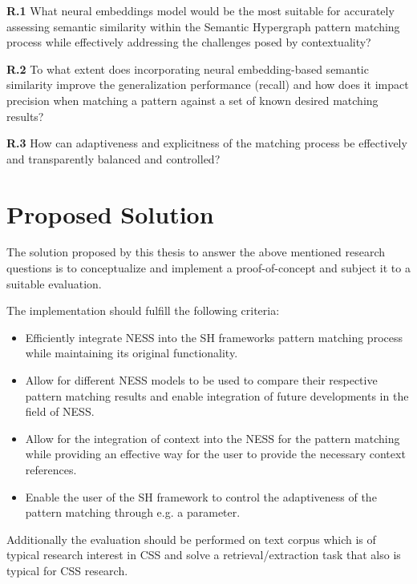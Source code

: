 \documentclass[11pt]{scrreprt}
\begin{document}
\textbf{R.1} What neural embeddings model would be the most suitable for accurately assessing semantic similarity within the Semantic Hypergraph pattern matching process while effectively addressing the challenges posed by contextuality?

\textbf{R.2} To what extent does incorporating neural embedding-based semantic similarity improve the generalization performance (recall) and how does it impact precision when matching a pattern against a set of known desired matching results?

\textbf{R.3} How can adaptiveness and explicitness of the matching process be effectively and transparently balanced and controlled?


\section{Proposed Solution}

The solution proposed by this thesis to answer the above mentioned research questions is to conceptualize and implement a proof-of-concept and subject it to a suitable evaluation. 

The implementation should fulfill the following criteria:

\begin{itemize}
	\item Efficiently integrate NESS into the SH frameworks pattern matching process while maintaining its original functionality.
	\item Allow for different NESS models to be used to compare their respective pattern matching results and enable integration of future developments in the field of NESS.
	\item Allow for the integration of context into the NESS for the pattern matching while providing an effective way for the user to provide the necessary context references.
	\item Enable the user of the SH framework to control the adaptiveness of the pattern matching through e.g. a parameter.
\end{itemize}

Additionally the evaluation should be performed on text corpus which is of typical research interest in CSS and solve a retrieval/extraction task that also is typical for CSS research. 
\end{document}
